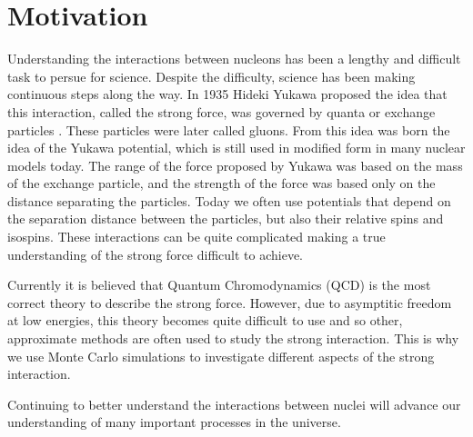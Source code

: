 \section{Motivation}
Understanding the interactions between nucleons has been a lengthy and difficult task to persue for science. Despite the difficulty, science has been making continuous steps along the way. In 1935 Hideki Yukawa proposed the idea that this interaction, called the strong force, was governed by quanta or exchange particles \cite{yukawa1935}. These particles were later called gluons. From this idea was born the idea of the Yukawa potential, which is still used in modified form in many nuclear models today. The range of the force proposed by Yukawa was based on the mass of the exchange particle, and the strength of the force was based only on the distance separating the particles. Today we often use potentials that depend on the separation distance between the particles, but also their relative spins and isospins. These interactions can be quite complicated making a true understanding of the strong force difficult to achieve.

Currently it is believed that Quantum Chromodynamics (QCD) is the most correct theory to describe the strong force. However, due to asymptitic freedom at low energies, this theory becomes quite difficult to use and so other, approximate methods are often used to study the strong interaction. This is why we use Monte Carlo simulations to investigate different aspects of the strong interaction.

Continuing to better understand the interactions between nuclei will advance our understanding of many important processes in the universe.
